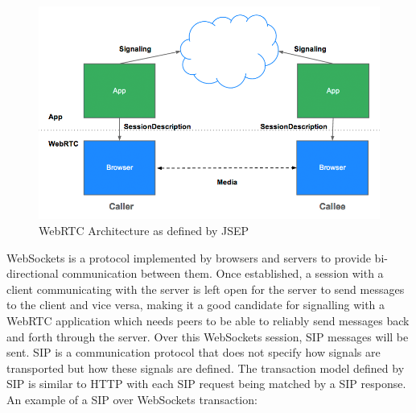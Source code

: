 \documentclass[]{report}
\begin{document}
			\begin{figure}[h!]
				\caption{WebRTC Architecture as defined by JSEP \cite{JSEP}}
				\includegraphics[scale=0.4]{jsep.png}
			\end{figure}
			\newpage
			
			WebSockets is a protocol implemented by browsers and servers to provide bi-directional communication between them\cite{WebSockets}. Once established, a session with a client communicating with the server is left open for the server to send messages to the client and vice versa, making it a good candidate for signalling with a WebRTC application which needs peers to be able to reliably send messages back and forth through the server. Over this WebSockets session, SIP messages will be sent. SIP is a communication protocol that does not specify how signals are transported but how these signals are defined. The transaction model defined by SIP is similar to HTTP with each SIP request being matched by a SIP response. An example of a SIP over WebSockets transaction:\cite{SIP Over WebSockets}
			
\end{document}
